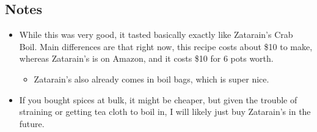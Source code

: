 \begin{multicols}{2}
\subsection*{Notes}
\begin{itemize}
    \item While this was very good, it tasted basically exactly like Zatarain’s Crab Boil. Main differences are that right now, this recipe costs about \$10 to make, whereas Zatarain’s is on Amazon, and it costs \$10 for 6 pots worth.
    \begin{itemize}
    	\item Zatarain’s also already comes in boil bags, which is super nice.
    \end{itemize}
    \item If you bought spices at bulk, it might be cheaper, but given the trouble of straining or getting tea cloth to boil in, I will likely just buy Zatarain’s in the future.
\end{itemize}
\end{multicols}
\clearpage